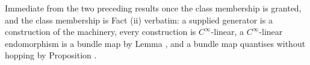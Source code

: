 Immediate from the two preceding results once the class membership is granted, and the class membership is Fact (ii) verbatim: a supplied generator is a construction of the machinery, every construction is $C^\infty$-linear, a $C^\infty$-linear endomorphism is a bundle map by Lemma , and a bundle map quantises without hopping by Proposition .
